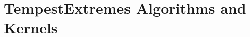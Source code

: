 \documentclass[gmdd, hvmath]{copernicus}
\begin{document}


\section{TempestExtremes Algorithms and Kernels} \label{sec:Kernels}
\end{document}
